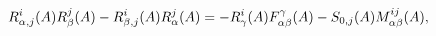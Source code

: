 \begin{equation}
R_{\alpha,j}^{i}(A)R_{\beta}^{j}(A)-R_{\beta,j}^{i}(A)R_{\alpha}^{j}(A)=-R_{%
\gamma}^{i}(A)F_{\alpha\beta}^{\gamma}(A)-S_{0,j}(A)M_{\alpha \beta}^{ij}(A),
\label{GAGGT}
\end{equation}

